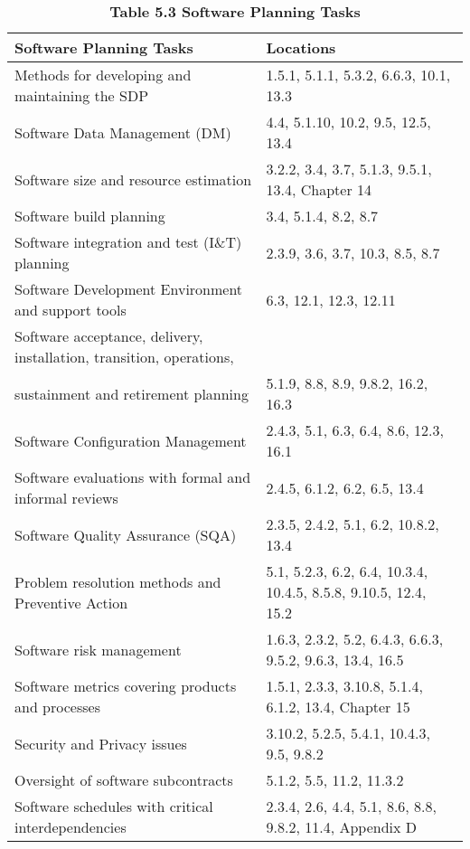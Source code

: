 \documentclass{book}
\begin{document}
	
	\begin{table}
		\begin{center}
			
		\caption{\textbf{Table 5.3 Software Planning Tasks}}
		\label{Table 5.3}
		\centering
		\setlength{\leftmargini}{0.5cm}
		\begin{tabular}{| m{8cm} | m{8cm} |}
			
			\hline Software Planning Tasks & Locations\\
			\hline Methods for developing and maintaining the SDP & 1.5.1, 5.1.1, 5.3.2, 6.6.3, 10.1, 13.3\\
			\hline Software Data Management (DM) & 4.4, 5.1.10, 10.2, 9.5, 12.5, 13.4\\
			\hline Software size and resource estimation & 3.2.2, 3.4, 3.7, 5.1.3, 9.5.1, 13.4, Chapter 14\\
			\hline Software build planning & 3.4, 5.1.4, 8.2, 8.7\\
			\hline Software integration and test (I\&T) planning & 2.3.9, 3.6, 3.7, 10.3, 8.5, 8.7\\
			\hline Software Development Environment and support tools & 6.3, 12.1, 12.3, 12.11\\
			\hline Software acceptance, delivery, installation, transition, operations,\\
			sustainment and retirement planning  & 5.1.9, 8.8, 8.9, 9.8.2, 16.2, 16.3\\
			\hline Software Configuration Management & 2.4.3, 5.1, 6.3, 6.4, 8.6, 12.3, 16.1\\
			\hline Software evaluations with formal and informal reviews & 2.4.5, 6.1.2, 6.2, 6.5, 13.4\\
			\hline Software Quality Assurance (SQA) & 2.3.5, 2.4.2, 5.1, 6.2, 10.8.2, 13.4\\
			\hline Problem resolution methods and Preventive Action & 5.1, 5.2.3, 6.2, 6.4, 10.3.4, 10.4.5, 8.5.8, 9.10.5, 12.4, 15.2\\
			\hline Software risk management & 1.6.3, 2.3.2, 5.2, 6.4.3, 6.6.3, 9.5.2, 9.6.3, 13.4, 16.5\\
			\hline Software metrics covering products and processes & 1.5.1, 2.3.3, 3.10.8, 5.1.4, 6.1.2, 13.4, Chapter 15\\
			\hline Security and Privacy issues & 3.10.2, 5.2.5, 5.4.1, 10.4.3, 9.5, 9.8.2\\
			\hline Oversight of software subcontracts & 5.1.2, 5.5, 11.2, 11.3.2\\
			\hline Software schedules with critical interdependencies & 2.3.4, 2.6, 4.4, 5.1, 8.6, 8.8, 9.8.2, 11.4, Appendix D\\

\end{tabular}
\end{center}
\end{table}
\end{document}
